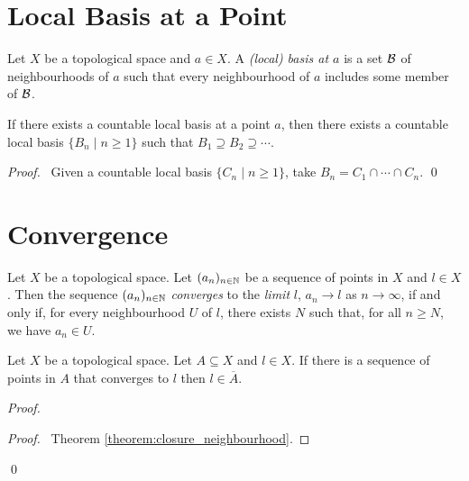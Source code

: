 \section{Local Basis at a Point}

\begin{definition}
    Let $X$ be a topological space and $a \in X$. A \emph{(local) basis at $a$} is a set $\mathcal{B}$ of neighbourhoods of $a$ such that every neighbourhood of $a$ includes some
    member of $\mathcal{B}$.
\end{definition}

\begin{lemma}
    \label{lemma:countable_local_basis}
    If there exists a countable local basis at a point $a$, then there exists a countable local basis $\{ B_n \mid n \geq 1 \}$ such that $B_1 \supseteq B_2 \supseteq \cdots$. 
\end{lemma}

\begin{proof}
    \pf\ Given a countable local basis $\{ C_n \mid n \geq 1 \}$, take $B_n = C_1 \cap \cdots \cap C_n$. \qed
\end{proof}

\section{Convergence}

\begin{definition}[Convergence]
    Let $X$ be a topological space. Let $(a_n)_{n \in \mathbb{N}}$ be a sequence of points in $X$ and $l \in X$.
    Then the sequence $(a_n)_{n \in \mathbb{N}}$ \emph{converges} to the \emph{limit} $l$, $a_n \rightarrow l$ as $n \rightarrow
    \infty$, if and only if, for every neighbourhood $U$ of $l$, there exists $N$ such that, for all
    $n \geq N$, we have $a_n \in U$.
\end{definition}

\begin{lemma}
    \label{lemma:sequence_lemma1}
    Let $X$ be a topological space. Let $A \subseteq X$ and $l \in X$. If there is a sequence of points in $A$ that converges to $l$ then $l \in \overline{A}$.
\end{lemma}

\begin{proof}
    \pf
    \qedstep
    \begin{proof}
        \pf\ Theorem \ref{theorem:closure_neighbourhood}.
    \end{proof}
    \qed
\end{proof}

